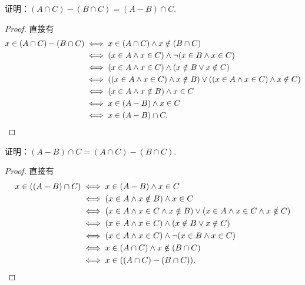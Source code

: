 \begin{example}
证明：\((A \cap C) - (B \cap C) = (A - B) \cap C\).
\begin{proof}
直接有\begin{align*}
	x \in (A \cap C) - (B \cap C)
	&\iff
	x \in (A \cap C)
	\land
	x \notin (B \cap C) \\
	&\iff
	(x \in A \land x \in C)
	\land
	\neg(x \in B \land x \in C) \\
	&\iff
	(x \in A \land x \in C)
	\land
	(x \notin B \lor x \notin C) \\
	&\iff
	((x \in A \land x \in C) \land x \notin B)
	\lor
	((x \in A \land x \in C) \land x \notin C) \\
	&\iff
	(x \in A \land x \notin B) \land x \in C \\
	&\iff
	x \in (A - B) \land x \in C \\
	&\iff x \in (A - B) \cap C.
	\qedhere
\end{align*}
\end{proof}
\end{example}

\begin{example}
证明：\((A - B) \cap C = (A \cap C) - (B \cap C)\).
\begin{proof}
直接有\begin{align*}
	x \in ((A - B) \cap C)
	&\iff
	x \in (A - B)
	\land
	x \in C \\
	&\iff
	(
		x \in A
		\land
		x \notin B
	)
	\land
	x \in C \\
	&\iff
	(
		x \in A
		\land
		x \in C
		\land
		x \notin B
	)
	\lor
	(
		x \in A
		\land
		x \in C
		\land
		x \notin C
	) \\
	&\iff
	(
		x \in A
		\land
		x \in C
	)
	\land
	(
		x \notin B
		\lor
		x \notin C
	) \\
	&\iff
	(
		x \in A
		\land
		x \in C
	)
	\land
	\neg(
		x \in B
		\land
		x \in C
	) \\
	&\iff
	x \in (A \cap C)
	\land
	x \notin (B \cap C) \\
	&\iff
	x \in ((A \cap C) - (B \cap C)).
	\qedhere
\end{align*}
\end{proof}
\end{example}

